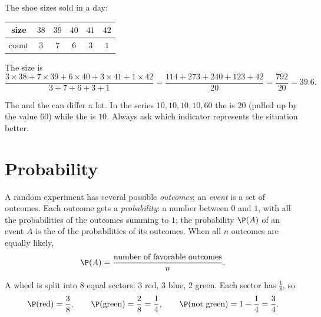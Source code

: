 \begin{example}\label{ex:g9:statproba:weighted}
The shoe sizes sold in a day:
\begin{center}
\renewcommand{\arraystretch}{1.2}
\begin{tabular}{c|ccccc}
size & $38$ & $39$ & $40$ & $41$ & $42$ \\
\hline
count & $3$ & $7$ & $6$ & $3$ & $1$ \\
\end{tabular}
\end{center}
The  size is
\[
\frac{3 \times 38 + 7 \times 39 + 6 \times 40 + 3 \times 41 + 1 \times 42}
{3 + 7 + 6 + 3 + 1}
= \frac{114 + 273 + 240 + 123 + 42}{20}
= \frac{792}{20} = 39.6 .
\]
\end{example}

\begin{remark}
The  and the  can differ a lot. In the series
$10, 10, 10, 10, 60$ the  is $20$ (pulled up by the value $60$) while
the  is $10$. Always ask which indicator represents the situation
better.
\end{remark}

\section{Probability}

\begin{definition}[Probability]\label{def:g9:statproba:probability}
A random experiment has several possible \emph{outcomes}; an
\emph{event} is a set of outcomes. Each outcome gets a
\emph{probability}: a number between $0$ and $1$,
with all the probabilities of the outcomes summing to $1$; the
probability $\P(A)$ of an event $A$ is the  of the probabilities of
its outcomes. When all $n$ outcomes are equally likely,
\[
\P(A) = \frac{\text{number of favorable outcomes}}{n}.
\]
\end{definition}

\begin{example}\label{ex:g9:statproba:spinner}
A wheel is split into $8$ equal sectors: $3$ red, $3$ blue, $2$ green.
Each sector has  $\frac18$, so
\[
\P(\text{red}) = \frac38, \qquad
\P(\text{green}) = \frac28 = \frac14, \qquad
\P(\text{not green}) = 1 - \frac14 = \frac34 .
\]
\end{example}

